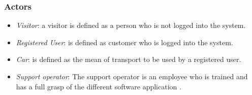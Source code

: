 \documentclass[12pt]{article}
\begin{document}
	\subsubsection{Actors}
		\begin{itemize}
 	 	\item \textit{Visitor}: a visitor is defined as a person who is not logged into the system.
  		\item \textit{Registered User}: is defined as customer who is  logged into the system.
  		
  		\item \textit{Car}: is defined as the mean of transport to be used by a registered user.
  		
  		\item \textit{Support operator}: The support operator is an employee who is trained and has a full grasp of the different software application .

	\end{itemize}
	
\end{document}
